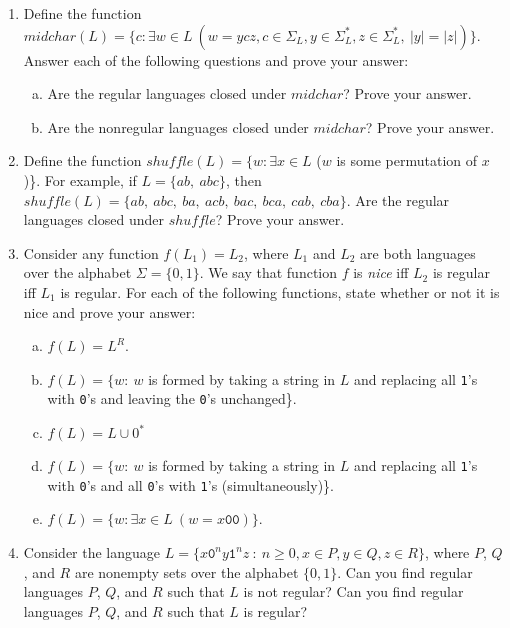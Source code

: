 \documentclass[10pt]{article}
\newcommand{\card}[1]{\left| #1 \right|}
\begin{document}
\begin{enumerate}[1)]
\item
Define the function $midchar(L) = \{c : \exists w \in L\ (w = ycz, c \in \Sigma _L, y \in \Sigma _L^*, z \in \Sigma _L^*,\ \card{y} = \card{z})\}$.  Answer each of the following questions and prove your answer:

\begin{enumerate}[a)]
\item
Are the regular languages closed under $midchar$?  Prove your answer.

\item
Are the nonregular languages closed under $midchar$?  Prove your answer.
\end{enumerate}

\item
Define the function $shuffle(L) = \{w : \exists x \in L$ ($w$ is some permutation of $x$)\}.  For example, if $L = \{ab,\ abc\}$, then $shuffle(L) = \{ab,\ abc,\ ba,\ acb,\ bac,\ bca,\ cab,\ cba\}$.  Are the regular languages closed under $shuffle$?  Prove your answer.

\item
Consider any function $f(L_1) = L_2$, where $L_1$ and $L_2$ are both languages over the alphabet $\Sigma = \{0, 1\}$.  We say that function $f$ is \textit{nice} iff  $L_2$ is regular iff $L_1$ is regular.  For each of the following functions, state whether or not it is nice and prove your answer:

\begin{enumerate}[a)]
\item
$f(L) = L^R$.

\item
$f(L)  =  \{w:\ w$ is formed by taking a string in $L$ and replacing all  \texttt{1}'s with  \texttt{0}'s and leaving the  \texttt{0}'s unchanged\}.

\item
$f(L) = L \cup 0^*$

\item
$f(L)  =  \{w:\ w$ is formed by taking a string in $L$ and replacing all \texttt{1}'s with  \texttt{0}'s and all  \texttt{0}'s with  \texttt{1}'s (simultaneously)\}.

\item
$f(L) = \{w: \exists x \in L\ (w = x\texttt{00})\}$.
\end{enumerate}


\item
Consider the language $L = \{x\texttt{0}^ny\texttt{1}^nz\ :\ n \geq 0, x \in P, y \in Q, z \in R\}$, where $P$, $Q$, and $R$ are nonempty sets over the alphabet $\{0, 1\}$.  Can you find regular languages $P$, $Q$, and $R$ such that $L$ is not regular?  Can you find regular languages $P$, $Q$, and $R$ such that $L$ is regular?
\end{enumerate}
\end{document}
